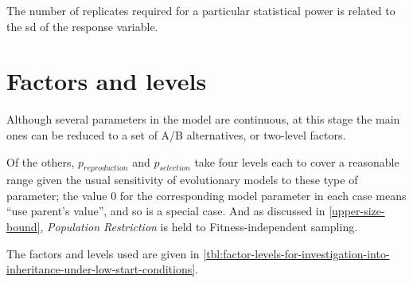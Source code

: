 The number of \glspl{replicate} required for a particular statistical power is related to the \gls{sd} of the response variable.


\section{Factors and levels}\label{factors-and-levels}

Although several parameters in the model are continuous, at this stage the main ones can be reduced to a set of A/B alternatives, or two-level factors.

Of the others, $p_{reproduction}$ and $p_{selection}$ take four levels each to cover a reasonable range given the usual sensitivity of evolutionary models to these type of parameter; the value $0$ for the corresponding model parameter in each case means ``use parent's value'', and so is a special case. And as discussed in \ref{upper-size-bound}, \emph{Population Restriction} is held to Fitness-independent sampling.

The factors and levels used are given in \ref{tbl:factor-levels-for-investigation-into-inheritance-under-low-start-conditions}.

